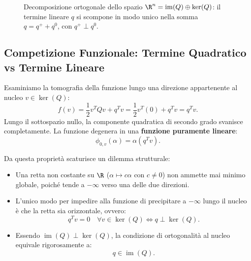 \begin{figure}[H]
\caption{Decomposizione ortogonale dello spazio $\R^n = \operatorname{im}(Q) \oplus \ker(Q)$: il termine lineare $q$ si scompone in modo unico nella somma $q = q^+ + q^0$, con $q^+ \perp q^0$.}
\label{fig:decomposizione-ortogonale-q}
\end{figure}

\subsection{Competizione Funzionale: Termine Quadratico vs Termine Lineare}
Esaminiamo la tomografia della funzione lungo una direzione appartenente al nucleo $v \in \ker(Q)$:
\begin{equation}
    f(v) = \frac{1}{2} v^T Q v + q^T v = \frac{1}{2} v^T (0) + q^T v = q^T v.
\end{equation}
Lungo il sottospazio nullo, la componente quadratica di secondo grado svanisce completamente. La funzione degenera in una \textbf{funzione puramente lineare}:
\begin{equation}
    \phi_{0, v}(\alpha) = \alpha (q^T v).
\end{equation}

Da questa propriet\`a scaturisce un dilemma strutturale:
\begin{itemize}
    \item Una retta non costante su $\R$ ($\alpha \mapsto c\alpha$ con $c \neq 0$) non ammette mai minimo globale, poich\'e tende a $-\infty$ verso una delle due direzioni.
    \item L'unico modo per impedire alla funzione di precipitare a $-\infty$ lungo il nucleo \`e che la retta sia orizzontale, ovvero:
    \begin{equation}
        q^T v = 0 \quad \forall v \in \ker(Q) \iff q \perp \ker(Q).
    \end{equation}
    \item Essendo $\operatorname{im}(Q) \perp \ker(Q)$, la condizione di ortogonalit\`a al nucleo equivale rigorosamente a:
    \begin{equation}
        q \in \operatorname{im}(Q).
    \end{equation}
\end{itemize}

